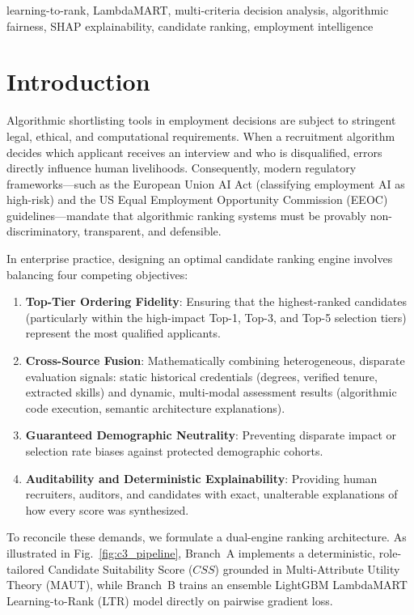 \documentclass[conference]{IEEEtran}
\begin{document}
\begin{IEEEkeywords}
learning-to-rank, LambdaMART, multi-criteria decision analysis, algorithmic fairness, SHAP explainability, candidate ranking, employment intelligence
\end{IEEEkeywords}

\section{Introduction}
Algorithmic shortlisting tools in employment decisions are subject to stringent legal, ethical, and computational requirements. When a recruitment algorithm decides which applicant receives an interview and who is disqualified, errors directly influence human livelihoods. Consequently, modern regulatory frameworks—such as the European Union AI Act (classifying employment AI as high-risk) and the US Equal Employment Opportunity Commission (EEOC) guidelines—mandate that algorithmic ranking systems must be provably non-discriminatory, transparent, and defensible.

In enterprise practice, designing an optimal candidate ranking engine involves balancing four competing objectives:
\begin{enumerate}
    \item \textbf{Top-Tier Ordering Fidelity}: Ensuring that the highest-ranked candidates (particularly within the high-impact Top-1, Top-3, and Top-5 selection tiers) represent the most qualified applicants.
    \item \textbf{Cross-Source Fusion}: Mathematically combining heterogeneous, disparate evaluation signals: static historical credentials (degrees, verified tenure, extracted skills) and dynamic, multi-modal assessment results (algorithmic code execution, semantic architecture explanations).
    \item \textbf{Guaranteed Demographic Neutrality}: Preventing disparate impact or selection rate biases against protected demographic cohorts.
    \item \textbf{Auditability and Deterministic Explainability}: Providing human recruiters, auditors, and candidates with exact, unalterable explanations of how every score was synthesized.
\end{enumerate}

To reconcile these demands, we formulate a dual-engine ranking architecture. As illustrated in Fig.~\ref{fig:c3_pipeline}, Branch~A implements a deterministic, role-tailored Candidate Suitability Score ($CSS$) grounded in Multi-Attribute Utility Theory (MAUT), while Branch~B trains an ensemble LightGBM LambdaMART Learning-to-Rank (LTR) model directly on pairwise gradient loss.
\end{document}
